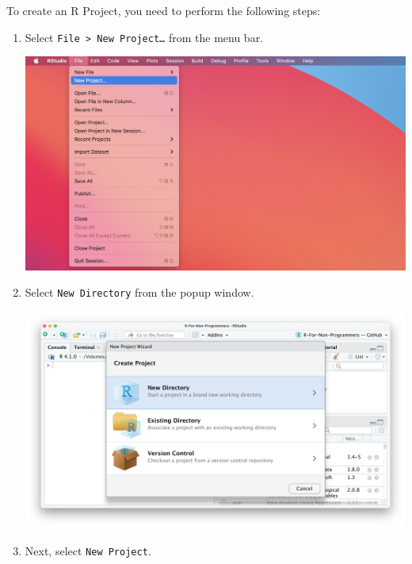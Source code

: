 \documentclass[
]{book}
\begin{document}
To create an R Project, you need to perform the following steps:

\begin{enumerate}
\def\labelenumi{\arabic{enumi}.}
\item
  Select \texttt{File\ \textgreater{}\ New\ Project\ldots{}} from the menu bar.

  \includegraphics{images/chapter_06_img/00_r_project/00_r_project_file_menu.png}
\item
  Select \texttt{New\ Directory} from the popup window.

  \includegraphics{images/chapter_06_img/00_r_project/01_r_project_new_directory.png}
\item
  Next, select \texttt{New\ Project}.


\end{enumerate}
\end{document}
